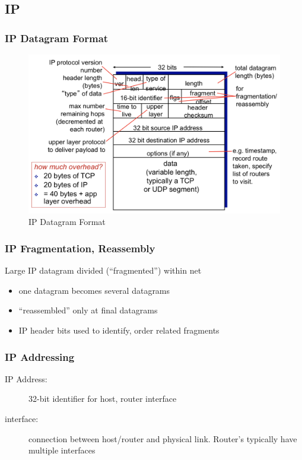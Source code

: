 \subsection{IP}
\subsubsection{IP Datagram Format}
\begin{figure}[H]
	\includegraphics[width=\linewidth]{ip}
	\centering
	\caption{IP Datagram Format}
\end{figure}
\subsubsection{IP Fragmentation, Reassembly}
Large IP datagram divided (``fragmented'') within net
\begin{itemize}
	\item one datagram becomes several datagrams
	\item ``reassembled'' only at final datagrams
	\item IP header bits used to identify, order related fragments
\end{itemize}
\subsubsection{IP Addressing}
\begin{description}
	\item[IP Address:] 32-bit identifier for host, router interface
	\item[interface:] connection between host/router and physical link. Router's typically have multiple interfaces
\end{description}
